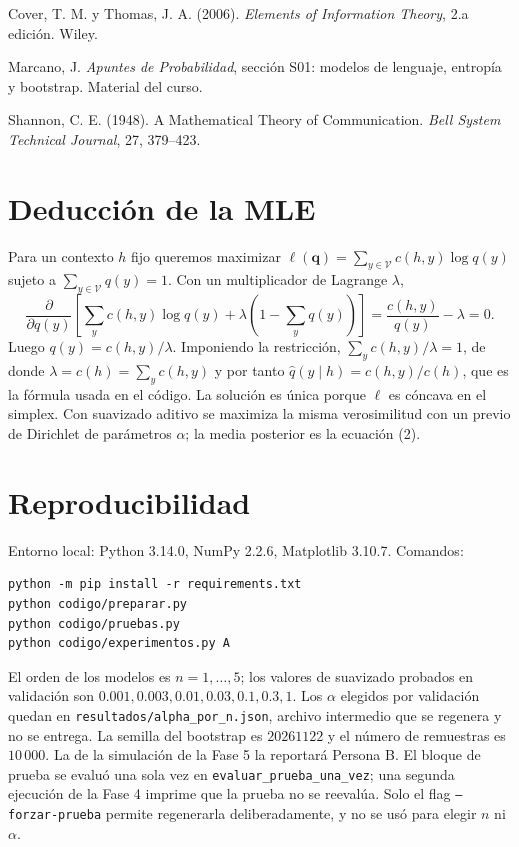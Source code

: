 \documentclass[11pt,letterpaper]{article}
\begin{document}
Cover, T. M. y Thomas, J. A. (2006). \emph{Elements of Information Theory},
2.a edición. Wiley.

Marcano, J. \emph{Apuntes de Probabilidad}, sección S01: modelos de lenguaje,
entropía y bootstrap. Material del curso.

Shannon, C. E. (1948). A Mathematical Theory of Communication.
\emph{Bell System Technical Journal}, 27, 379--423.

\appendix

\section{Deducción de la MLE}

Para un contexto $h$ fijo queremos maximizar
$\ell(\mathbf{q})=\sum_{y\in\mathcal{V}}c(h,y)\log q(y)$ sujeto a
$\sum_{y\in\mathcal{V}}q(y)=1$. Con un multiplicador de Lagrange $\lambda$,
\[
  \frac{\partial}{\partial q(y)}
  \left[\sum_{y}c(h,y)\log q(y)+\lambda\left(1-\sum_y q(y)\right)\right]
  =\frac{c(h,y)}{q(y)}-\lambda=0 .
\]
Luego $q(y)=c(h,y)/\lambda$. Imponiendo la restricción,
$\sum_y c(h,y)/\lambda=1$, de donde $\lambda=c(h)=\sum_y c(h,y)$ y por tanto
$\hat q(y\mid h)=c(h,y)/c(h)$, que es la fórmula usada en el código. La
solución es única porque $\ell$ es cóncava en el simplex. Con suavizado
aditivo se maximiza la misma verosimilitud con un previo de Dirichlet de
parámetros $\alpha$; la media posterior es la ecuación (2).

\section{Reproducibilidad}

Entorno local: Python 3.14.0, NumPy 2.2.6, Matplotlib 3.10.7. Comandos:
\begin{verbatim}
python -m pip install -r requirements.txt
python codigo/preparar.py
python codigo/pruebas.py
python codigo/experimentos.py A
\end{verbatim}
El orden de los modelos es $n=1,\dots,5$; los valores de suavizado probados en
validación son $0.001,0.003,0.01,0.03,0.1,0.3,1$. Los $\alpha$ elegidos por
validación quedan en \texttt{resultados/alpha_por_n.json}, archivo intermedio
que se regenera y no se entrega. La semilla del bootstrap es $20261122$ y el
número de remuestras es $10\,000$. La de la simulación de la Fase 5 la reportará
Persona B. El bloque de prueba se evaluó una sola vez en
\texttt{evaluar\_prueba\_una\_vez}; una segunda ejecución de la Fase 4 imprime
que la prueba no se reevalúa. Solo el flag \texttt{--forzar-prueba} permite
regenerarla deliberadamente, y no se usó para elegir $n$ ni $\alpha$.
\end{document}
